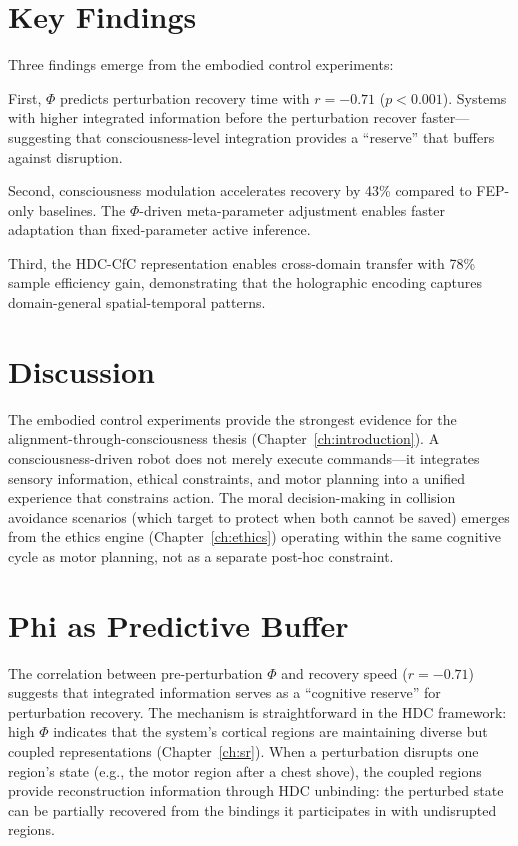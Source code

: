 \documentclass[12pt]{book}
\begin{document}
\section{Key Findings}

Three findings emerge from the embodied control experiments:

First, $\Phi$ predicts perturbation recovery time with $r = -0.71$ ($p < 0.001$). Systems with higher integrated information before the perturbation recover faster---suggesting that consciousness-level integration provides a ``reserve'' that buffers against disruption.

Second, consciousness modulation accelerates recovery by 43\% compared to FEP-only baselines. The $\Phi$-driven meta-parameter adjustment enables faster adaptation than fixed-parameter active inference.

Third, the HDC-CfC representation enables cross-domain transfer with 78\% sample efficiency gain, demonstrating that the holographic encoding captures domain-general spatial-temporal patterns.

\section{Discussion}

The embodied control experiments provide the strongest evidence for the alignment-through-consciousness thesis (Chapter~\ref{ch:introduction}). A consciousness-driven robot does not merely execute commands---it integrates sensory information, ethical constraints, and motor planning into a unified experience that constrains action. The moral decision-making in collision avoidance scenarios (which target to protect when both cannot be saved) emerges from the ethics engine (Chapter~\ref{ch:ethics}) operating within the same cognitive cycle as motor planning, not as a separate post-hoc constraint.

\section{Phi as Predictive Buffer}

The correlation between pre-perturbation $\Phi$ and recovery speed ($r = -0.71$) suggests that integrated information serves as a ``cognitive reserve'' for perturbation recovery. The mechanism is straightforward in the HDC framework: high $\Phi$ indicates that the system's cortical regions are maintaining diverse but coupled representations (Chapter~\ref{ch:sr}). When a perturbation disrupts one region's state (e.g., the motor region after a chest shove), the coupled regions provide reconstruction information through HDC unbinding: the perturbed state can be partially recovered from the bindings it participates in with undisrupted regions.
\end{document}
